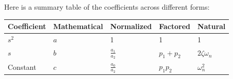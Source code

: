 Here is a summary table of the coefficients across different forms:

\begin{center}
  \begin{tabularx}{\linewidth}{|X|X|X|X|X|}
    \hline
    \textbf{Coefficient} & \textbf{Mathematical} & \textbf{Normalized} & \textbf{Factored} & \textbf{Natural} \\
    \hline
    \(s^2\) & \(a\) & 1 & 1 & 1 \\
    \hline
    \(s\) & \(b\) & \(\displaystyle\frac{a_1}{a_2}\) & \(p_1 + p_2\) & \(2\zeta\omega_n\) \\
    \hline
    Constant & \(c\) & \(\displaystyle\frac{a_0}{a_2}\) & \(p_1 p_2\) & \(\omega_n^2\) \\
    \hline
  \end{tabularx}
\end{center}

